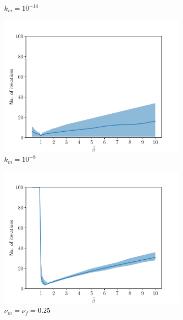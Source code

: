 \documentclass[a4paper]{article}
\numberwithin{equation}{section}
\begin{document}
\begin{figure}
\begin{subfigure}[b]{0.49\textwidth}
\caption{$k_m=10^{-14}$}
\end{subfigure}
% 
\begin{subfigure}[b]{0.49\textwidth}
\centering
\includegraphics[width=\textwidth]{figures/conv_result_linear_dt_100_alpha_1_cond_9p81e-05_Er_6e+10_Ef_1e+06_nur_0_nuf_0.pdf}
\caption{$k_m=10^{-8}$}
\end{subfigure}
% 
\begin{subfigure}[b]{0.49\textwidth}
\centering
\includegraphics[width=\textwidth]{figures/conv_result_linear_dt_100_alpha_1_cond_9p81e-18_Er_6e+10_Ef_1e+06_nur_0p25_nuf_0p25.pdf}
\caption{$\nu_m=\nu_f=0.25$}
\end{subfigure}
% 
\begin{subfigure}[b]{0.49\textwidth}

\end{subfigure}
\end{figure}
\end{document}

